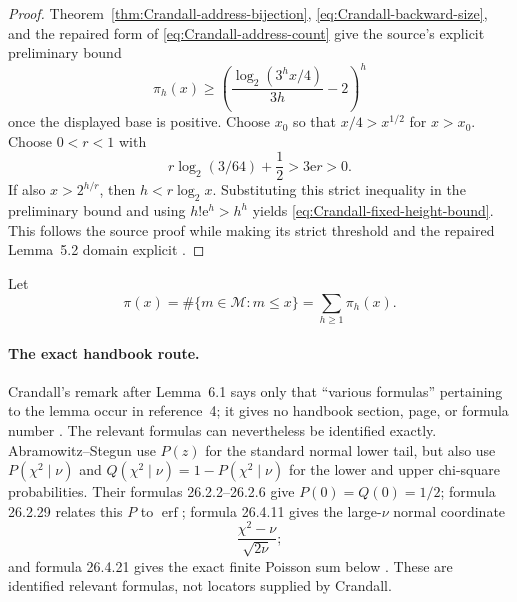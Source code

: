 \begin{proof}
Theorem~\ref{thm:Crandall-address-bijection},
\eqref{eq:Crandall-backward-size}, and the repaired form of
\eqref{eq:Crandall-address-count} give the source's explicit preliminary
bound
\[
 \pi_h(x)\geq
 \left(\frac{\log_2(3^h x/4)}{3h}-2\right)^h
\]
once the displayed base is positive.  Choose $x_0$ so that $x/4>x^{1/2}$
for $x>x_0$.  Choose $0<r<1$ with
\begin{equation}
\label{eq:Crandall-r-choice}
 r\log_2(3/64)+\frac12>3\mathrm e r>0.
\end{equation}
If also $x>2^{h/r}$, then $h<r\log_2x$.  Substituting this strict inequality
in the preliminary bound and using $h!\mathrm e^h>h^h$ yields
\eqref{eq:Crandall-fixed-height-bound}.  This follows the source proof while
making its strict threshold and the repaired Lemma~5.2 domain explicit
\cite[p.~1286, Thm.~5.1]{Crandall1978}.
\end{proof}

Let
\begin{equation}
\label{eq:Crandall-pi-total}
 \pi(x)=\#\{m\in\mathcal M:m\leq x\}
       =\sum_{h\geq1}\pi_h(x).
\end{equation}

\paragraph{The exact handbook route.}
Crandall's remark after Lemma~6.1 says only that ``various formulas''
pertaining to the lemma occur in reference~4; it gives no handbook section,
page, or formula number \cite[p.~1287]{Crandall1978}.  The relevant formulas
can nevertheless be identified exactly.  Abramowitz--Stegun use $P(z)$ for
the standard normal lower tail, but also use $P(\chi^2\mid\nu)$ and
$Q(\chi^2\mid\nu)=1-P(\chi^2\mid\nu)$ for the lower and upper chi-square
probabilities.  Their formulas 26.2.2--26.2.6 give $P(0)=Q(0)=1/2$; formula
26.2.29 relates this $P$ to $\operatorname{erf}$; formula 26.4.11 gives the
large-$\nu$ normal coordinate
\[
 \frac{\chi^2-\nu}{\sqrt{2\nu}};
\]
and formula 26.4.21 gives the exact finite Poisson sum below
\cite[printed pp.~931, 934, 940--941]{AbramowitzStegun1964}.  These are
identified relevant formulas, not locators supplied by Crandall.

